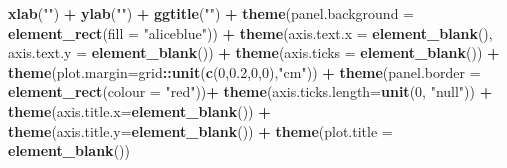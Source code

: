 \documentclass[12pt,oneside]{reedthesis}
\newenvironment{Shaded}{\begin{snugshade}}{\end{snugshade}}
\newcommand{\DataTypeTok}[1]{\textcolor[rgb]{0.13,0.29,0.53}{#1}}
\newcommand{\DecValTok}[1]{\textcolor[rgb]{0.00,0.00,0.81}{#1}}
\newcommand{\FloatTok}[1]{\textcolor[rgb]{0.00,0.00,0.81}{#1}}
\newcommand{\KeywordTok}[1]{\textcolor[rgb]{0.13,0.29,0.53}{\textbf{#1}}}
\newcommand{\NormalTok}[1]{#1}
\newcommand{\OperatorTok}[1]{\textcolor[rgb]{0.81,0.36,0.00}{\textbf{#1}}}
\newcommand{\StringTok}[1]{\textcolor[rgb]{0.31,0.60,0.02}{#1}}
\begin{document}
\begin{Shaded}
\begin{Highlighting}[]
\StringTok{  }\KeywordTok{xlab}\NormalTok{(}\StringTok{""}\NormalTok{) }\OperatorTok{+}\StringTok{ }
\StringTok{  }\KeywordTok{ylab}\NormalTok{(}\StringTok{""}\NormalTok{) }\OperatorTok{+}\StringTok{ }
\StringTok{  }\KeywordTok{ggtitle}\NormalTok{(}\StringTok{""}\NormalTok{) }\OperatorTok{+}
\StringTok{  }\KeywordTok{theme}\NormalTok{(}\DataTypeTok{panel.background =} \KeywordTok{element_rect}\NormalTok{(}\DataTypeTok{fill =} \StringTok{"aliceblue"}\NormalTok{)) }\OperatorTok{+}
\StringTok{  }\KeywordTok{theme}\NormalTok{(}\DataTypeTok{axis.text.x =} \KeywordTok{element_blank}\NormalTok{(), }\DataTypeTok{axis.text.y =} \KeywordTok{element_blank}\NormalTok{()) }\OperatorTok{+}
\StringTok{  }\KeywordTok{theme}\NormalTok{(}\DataTypeTok{axis.ticks =} \KeywordTok{element_blank}\NormalTok{()) }\OperatorTok{+}
\StringTok{  }\KeywordTok{theme}\NormalTok{(}\DataTypeTok{plot.margin=}\NormalTok{grid}\OperatorTok{::}\KeywordTok{unit}\NormalTok{(}\KeywordTok{c}\NormalTok{(}\DecValTok{0}\NormalTok{,}\FloatTok{0.2}\NormalTok{,}\DecValTok{0}\NormalTok{,}\DecValTok{0}\NormalTok{),}\StringTok{"cm"}\NormalTok{)) }\OperatorTok{+}\StringTok{ }
\StringTok{  }\KeywordTok{theme}\NormalTok{(}\DataTypeTok{panel.border =} \KeywordTok{element_rect}\NormalTok{(}\DataTypeTok{colour =} \StringTok{"red"}\NormalTok{))}\OperatorTok{+}
\StringTok{  }\KeywordTok{theme}\NormalTok{(}\DataTypeTok{axis.ticks.length=}\KeywordTok{unit}\NormalTok{(}\DecValTok{0}\NormalTok{, }\StringTok{"null"}\NormalTok{)) }\OperatorTok{+}
\StringTok{  }\KeywordTok{theme}\NormalTok{(}\DataTypeTok{axis.title.x=}\KeywordTok{element_blank}\NormalTok{()) }\OperatorTok{+}
\StringTok{  }\KeywordTok{theme}\NormalTok{(}\DataTypeTok{axis.title.y=}\KeywordTok{element_blank}\NormalTok{()) }\OperatorTok{+}
\StringTok{  }\KeywordTok{theme}\NormalTok{(}\DataTypeTok{plot.title =} \KeywordTok{element_blank}\NormalTok{())}


\end{Highlighting}
\end{Shaded}
\end{document}
